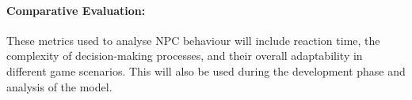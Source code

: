 \paragraph{Comparative Evaluation:}
These metrics used to analyse NPC behaviour will include reaction time, the complexity of decision-making processes, and their overall adaptability in different game scenarios. This will also be used during the development phase and analysis of the model.





